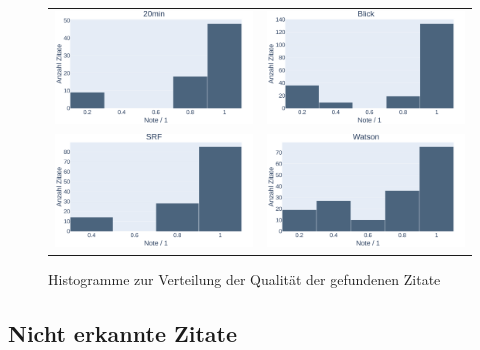\begin{figure}[H]
	\begin{tabular}{ll}
		\includegraphics[width=.5\linewidth]{./images/citation_grades_20min.png} & \includegraphics[width=.5\linewidth]{./images/citation_grades_blick.png} \\
		\includegraphics[width=.5\linewidth]{./images/citation_grades_srf.png} & \includegraphics[width=.5\linewidth]{./images/citation_grades_watson.png} \\
	\end{tabular}
	\caption{Histogramme zur Verteilung der Qualität der gefundenen Zitate}
	\label{histogram-grades}
\end{figure}

\subsection{Nicht erkannte Zitate}\label{not-recognized-quotes}

